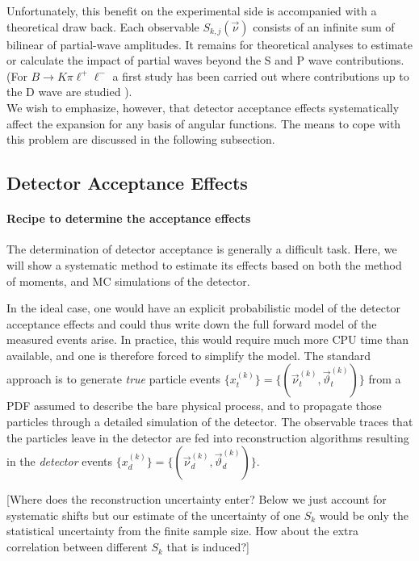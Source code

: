 \documentclass[aps,prd,reprint,nofootinbib,preprintnumbers]{revtex4}
\renewcommand{\theta}{\vartheta}
\newcommand{\fred}[1]{{\color{brown!85!black}#1}}
\begin{document}
Unfortunately, this benefit on the experimental side is accompanied with a theoretical draw back. Each observable
$S_{k,j}(\vec{\nu})$ consists of an infinite sum of bilinear of partial-wave amplitudes. It remains for theoretical
analyses to estimate or calculate the impact of partial waves beyond the S and P wave contributions.
(For $B\to K\pi\ell^+\ell^-$ a first study has been carried out where contributions up to the D wave are studied \cite{Das:2014sra}).\\

We wish to emphasize, however, that detector acceptance effects systematically affect the expansion for any basis
of angular functions. The means to cope with this problem are discussed in the following subsection.


\subsection{Detector Acceptance Effects}
\label{sec:systematics:acceptance}

\paragraph{Recipe to determine the acceptance effects}

The determination of detector acceptance is generally a difficult
task. Here, we will show a systematic method to estimate its effects
based on both the method of moments, and MC simulations of the
detector.

\fred{In the ideal case, one would have an explicit probabilistic
  model of the detector acceptance effects and could thus write down
  the full forward model of the measured events arise. In practice,
  this would require much more CPU time than available, and one is
  therefore forced to simplify the model. The standard approach is to
  generate \emph{true} particle events $\lbrace x_t^{(k)}\rbrace =
  \lbrace(\vec{\nu}^{(k)}_t,\vec\theta^{(k)}_t)\rbrace$ from a PDF
  assumed to describe the bare physical process, and to propagate
  those particles through a detailed simulation of the detector. The
  observable traces that the particles leave in the detector are fed
  into reconstruction algorithms resulting in the \emph{detector}
  events $\lbrace x^{(k)}_d\rbrace = \lbrace(\vec{\nu}^{(k)}_d,
  \vec\theta^{(k)}_d)\rbrace$.

[Where does the reconstruction uncertainty enter? Below we just
  account for systematic shifts but our estimate of the uncertainty of
  one $S_k$ would be only the statistical uncertainty from the finite
  sample size. How about the extra correlation between different $S_k$
  that is induced?] }\\
\end{document}
